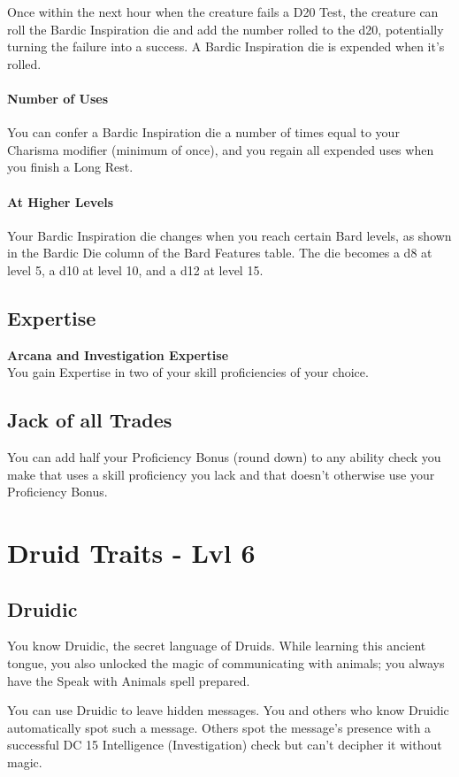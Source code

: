 \documentclass[letterpaper,openany,oneside,twocolumn]{book}
\begin{document}
Once within the next hour when the creature fails a D20 Test, the creature can roll the Bardic Inspiration die and add the number rolled to the d20, potentially turning the failure into a success. A Bardic Inspiration die is expended when it's rolled.
\paragraph*{Number of Uses} You can confer a Bardic Inspiration die a number of times equal to your Charisma modifier (minimum of once), and you regain all expended uses when you finish a Long Rest.
\paragraph*{At Higher Levels} Your Bardic Inspiration die changes when you reach certain Bard levels, as shown in the Bardic Die column of the Bard Features table. The die becomes a d8 at level 5, a d10 at level 10, and a d12 at level 15.
\subsection*{Expertise}
\textbf{Arcana and Investigation Expertise}\\
You gain Expertise in two of your skill proficiencies of your choice.
\subsection*{Jack of all Trades}
You can add half your Proficiency Bonus (round down) to any ability check you make that uses a skill proficiency you lack and that doesn't otherwise use your Proficiency Bonus.
\vfill\eject
\section*{Druid Traits - Lvl 6}%
\subsection*{Druidic}
You know Druidic, the secret language of Druids. While learning this ancient tongue, you also unlocked the magic of communicating with animals; you always have the Speak with Animals spell prepared.

You can use Druidic to leave hidden messages. You and others who know Druidic automatically spot such a message. Others spot the message's presence with a successful DC 15 Intelligence (Investigation) check but can't decipher it without magic.
\end{document}
